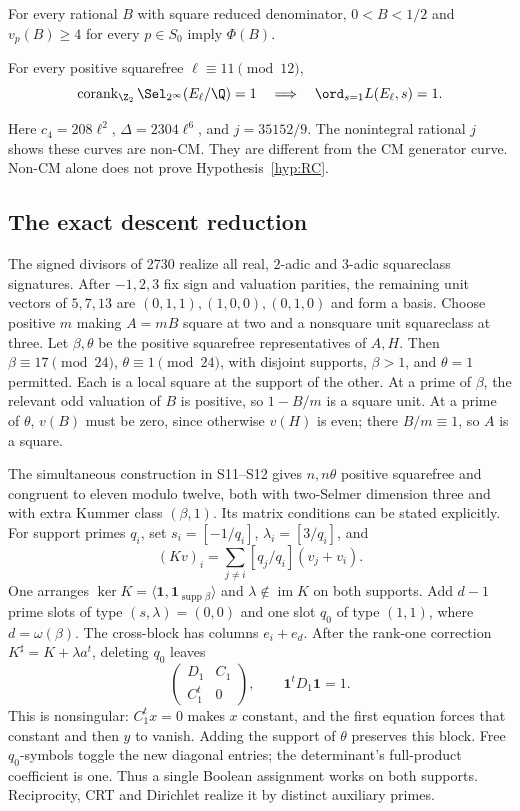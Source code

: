 \begin{hypothesis}\label{hyp:PC}
For every rational $B$ with square reduced denominator,
$0<B<1/2$ and $v_p(B)\ge4$ for every $p\in S_0$ imply $\Phi(B)$.
\end{hypothesis}
\begin{hypothesis}\label{hyp:RC}
For every positive squarefree $\ell\equiv11\pmod{12}$,
\[
 \operatorname{corank}_{\Z_2}\Sel_{2^\infty}(E_\ell/\Q)=1
 \quad\Longrightarrow\quad\ord_{s=1}L(E_\ell,s)=1.
\]
\end{hypothesis}
Here $c_4=208\ell^2$, $\Delta=2304\ell^6$, and $j=35152/9$.
The nonintegral rational $j$ shows these curves are non-CM. They are
different from the CM generator curve. Non-CM alone does not prove
Hypothesis~\ref{hyp:RC}.

\subsection{The exact descent reduction}
The signed divisors of 2730 realize all real, $2$-adic and $3$-adic
squareclass signatures. After $-1,2,3$ fix sign and valuation parities,
the remaining unit vectors of $5,7,13$ are
$(0,1,1),(1,0,0),(0,1,0)$ and form a basis. Choose positive $m$ making
$A=mB$ square at two and a nonsquare unit squareclass at three.
Let $\beta,\theta$ be the positive squarefree representatives of $A,H$.
Then $\beta\equiv17\pmod{24}$, $\theta\equiv1\pmod{24}$, with disjoint
supports, $\beta>1$, and $\theta=1$ permitted. Each is a local square
at the support of the other. At a prime of $\beta$, the relevant odd
valuation of $B$ is positive, so $1-B/m$ is a square unit. At a prime
of $\theta$, $v(B)$ must be zero, since otherwise $v(H)$ is even;
there $B/m\equiv1$, so $A$ is a square.

The simultaneous construction in S11--S12 gives $n,n\theta$ positive
squarefree and congruent to eleven modulo twelve, both with two-Selmer
dimension three and with extra Kummer class $(\beta,1)$. Its matrix
conditions can be stated explicitly. For support primes $q_i$, set
$s_i=[-1/q_i]$, $\lambda_i=[3/q_i]$, and
\[
 (Kv)_i=\sum_{j\ne i}[q_j/q_i](v_j+v_i).
\]
One arranges $\ker K=\langle\mathbf1,\mathbf1_{\operatorname{supp}\beta}\rangle$
and $\lambda\notin\operatorname{im}K$ on both supports. Add $d-1$
prime slots of type $(s,\lambda)=(0,0)$ and one slot $q_0$ of type
$(1,1)$, where $d=\omega(\beta)$. The cross-block has columns
$e_i+e_d$. After the rank-one correction $K^\sharp=K+\lambda a^t$,
deleting $q_0$ leaves
\[
 \begin{pmatrix}D_1&C_1\\C_1^t&0\end{pmatrix},
 \qquad\mathbf1^tD_1\mathbf1=1.
\]
This is nonsingular: $C_1^tx=0$ makes $x$ constant, and the first
equation forces that constant and then $y$ to vanish. Adding the
support of $\theta$ preserves this block. Free $q_0$-symbols toggle
the new diagonal entries; the determinant's full-product coefficient
is one. Thus a single Boolean assignment works on both supports.
Reciprocity, CRT and Dirichlet realize it by distinct auxiliary primes.

